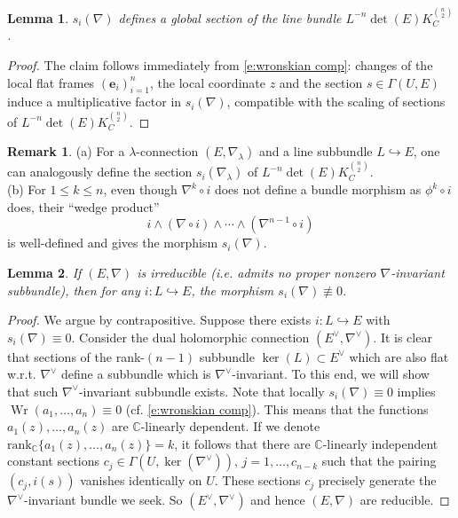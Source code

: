 \documentclass[twoside, 11pt]{article}
\numberwithin{equation}{section}
\theoremstyle{theorem}
\numberwithin{theorem}{section}
\newtheorem{lemma}[lemma]{Lemma}
\theoremstyle{definition}
\newtheorem{remark}[remark]{Remark}
\begin{document}
\begin{lemma}\label{lemma-morphsim-well-defined}
\( s_i(\nabla) \) defines a global section of the line bundle \( L^{-n} \det(E)  K_C^{\binom{n}{2}} \).
\end{lemma}
\begin{proof}
The claim follows immediately from \eqref{e:wronskian comp}:
changes of the local flat frames $(\mathbf{e}_i)_{i=1}^n$,   
the local coordinate $z$ 
and the section $s \in \Gamma(U, E)$
induce a multiplicative factor in $s_i(\nabla)$,
compatible with the scaling of sections of 
\( L^{-n} \det(E)  K_C^{\binom{n}{2}} \).
\end{proof}

\begin{remark}
(a) For a $\lambda$-connection $(E, \nabla_\lambda)$ and a line subbundle $L \hookrightarrow E$, one can analogously define the section $s_i(\nabla_\lambda)$ of \( L^{-n} \det(E)  K_C^{\binom{n}{2}} \).
\\
(b) For $1 \leq k \leq n$, 
even though $\nabla^k\circ i$ does not define a bundle morphism 
as $\phi^k \circ i$ does,
their ``wedge product''
$$i \wedge (\nabla \circ i) \wedge \cdots \wedge (\nabla^{n-1} \circ i) $$
is well-defined and gives the morphism $s_i(\nabla)$.
\end{remark}

\begin{lemma}
If $(E,\nabla)$ is irreducible (i.e. admits no proper nonzero $\nabla$-invariant subbundle), then for any $i:L\hookrightarrow E$, the morphism $s_i(\nabla)\not\equiv 0$.
\end{lemma}

\begin{proof}
We argue by contrapositive. Suppose there exists $i:L\hookrightarrow E$ with $s_i(\nabla)\equiv 0$.
Consider the dual holomorphic connection $(E^\vee, \nabla^\vee)$.
It is clear that 
sections of the rank-$(n-1)$ subbundle $\ker(L) \subset E^\vee$ which are also flat w.r.t. $\nabla^\vee$ 
define a subbundle which is $\nabla^\vee$-invariant.
To this end, we will show that such $\nabla^\vee$-invariant subbundle exists. Note that locally $s_i(\nabla)\equiv 0$ implies $\operatorname{Wr}(a_1,\dots,a_n)\equiv 0$ 
(cf. \eqref{e:wronskian comp}).
This means that the functions 
$a_1(z), \dots, a_n(z)$ are $\mathbb{C}$-linearly dependent. If we denote $\mathrm{rank}_{\mathbb C} \{ a_1(z), \dots, a_n(z) \} = k$,
it follows that there are $\mathbb{C}$-linearly independent constant sections $c_j \in \Gamma(U, \ker(\nabla^\vee))$, 
$j = 1, \dots, c_{n-k}$ such that the pairing $\left( c_j, i(s) \right)$ vanishes identically on $U$.
These sections $c_j$ precisely generate the $\nabla^\vee$-invariant bundle we seek.
So $(E^\vee, \nabla^\vee)$ and hence $(E, \nabla)$ are reducible.
\end{proof}
\end{document}
